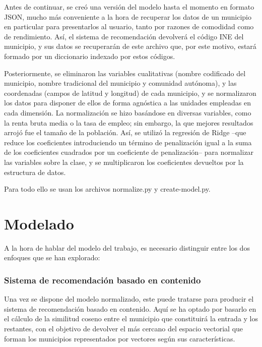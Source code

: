 
Antes de continuar, se creó una versión del modelo hasta el momento en formato JSON, mucho más conveniente a la hora de recuperar los datos de un municipio en particular para presentarlos al usuario, tanto por razones de comodidad como de rendimiento. Así, el sistema de recomendación devolverá el código INE del municipio, y sus datos se recuperarán de este archivo que, por este motivo, estará formado por un diccionario indexado por estos códigos.

Posteriormente, se eliminaron las variables cualitativas (nombre codificado del municipio, nombre tradicional del municipio y comunidad autónoma), y las coordenadas (campos de latitud y longitud) de cada municipio, y se normalizaron los datos para disponer de ellos de forma agnóstica a las unidades empleadas en cada dimensión. La normalización se hizo basándose en diversas variables, como la renta bruta media o la tasa de empleo; sin embargo, la que mejores resultados arrojó fue el tamaño de la población. Así, se utilizó la regresión de Ridge –que reduce los coeficientes introduciendo un término de penalización igual a la suma de los coeficientes cuadrados por un coeficiente de penalización– para normalizar las variables sobre la clase, y se multiplicaron los coeficientes devueltos por la estructura de datos.

Para todo ello se usan los archivos normalize.py y create-model.py.

\section{Modelado}

A la hora de hablar del modelo del trabajo, es necesario distinguir entre los dos enfoques que se han explorado:

\subsubsection{Sistema de recomendación basado en contenido}

Una vez se dispone del modelo normalizado, este puede tratarse para producir el sistema de recomendación basado en contenido. Aquí se ha optado por basarlo en el cálculo de la similitud coseno entre el municipio que constituirá la entrada y los restantes, con el objetivo de devolver el más cercano del espacio vectorial que forman los municipios representados por vectores según sus características.

